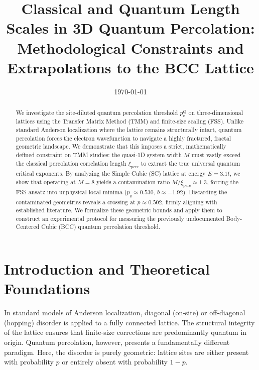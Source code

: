 \documentclass[11pt,a4paper]{article}
\title{Classical and Quantum Length Scales in 3D Quantum Percolation: Methodological Constraints and Extrapolations to the BCC Lattice}
\author{}
\date{\today}
\begin{document}
\maketitle

\begin{abstract}
We investigate the site-diluted quantum percolation threshold $p_c^Q$ on three-dimensional lattices using the Transfer Matrix Method (TMM) and finite-size scaling (FSS). Unlike standard Anderson localization where the lattice remains structurally intact, quantum percolation forces the electron wavefunction to navigate a highly fractured, fractal geometric landscape. We demonstrate that this imposes a strict, mathematically defined constraint on TMM studies: the quasi-1D system width $M$ must vastly exceed the classical percolation correlation length $\xi_{\text{perc}}$ to extract the true universal quantum critical exponents. By analyzing the Simple Cubic (SC) lattice at energy $E=3.1t$, we show that operating at $M=8$ yields a contamination ratio $M/\xi_{\text{perc}} \approx 1.3$, forcing the FSS ansatz into unphysical local minima ($p_q \approx 0.530$, $b \approx -1.92$). Discarding the contaminated geometries reveals a crossing at $p \approx 0.502$, firmly aligning with established literature. We formalize these geometric bounds and apply them to construct an experimental protocol for measuring the previously undocumented Body-Centered Cubic (BCC) quantum percolation threshold.
\end{abstract}

\section{Introduction and Theoretical Foundations}

In standard models of Anderson localization, diagonal (on-site) or off-diagonal (hopping) disorder is applied to a fully connected lattice. The structural integrity of the lattice ensures that finite-size corrections are predominantly quantum in origin. Quantum percolation, however, presents a fundamentally different paradigm. Here, the disorder is purely geometric: lattice sites are either present with probability $p$ or entirely absent with probability $1-p$. 
\end{document}
